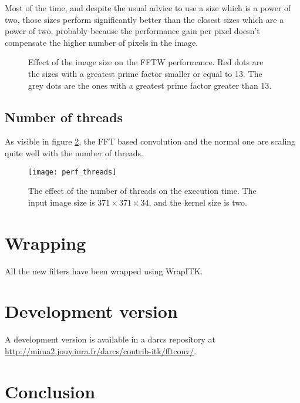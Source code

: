 \documentclass{InsightArticle}
\begin{document}
Most of the time, and despite the usual advice to use a size which is a power of two,
those sizes perform significantly better than the closest sizes which are a power of two, probably
because the performance gain per pixel doesn't compensate the higher number of pixels in the image.

\begin{figure}[htbp]
\begin{center}
\caption{Effect of the image size on the FFTW performance. Red dots are the sizes with a greatest prime
factor smaller or equal to 13. The grey dots are the ones with a greatest prime factor greater than 13.
\label{fig:perf-fftw3}}
\end{center}
\end{figure}

\subsection{Number of threads}

As visible in figure \ref{fig:perf-kernel}, the FFT based convolution and the normal one are scaling
quite well with the number of threads.

\begin{figure}[htbp]
\centering
\texttt{[image: perf\_threads]}
\caption{The effect of the number of threads on the execution time. The input image size is
$371 \times 371 \times 34$, and the kernel size is two.
\label{fig:perf-kernel}}
\end{figure}

\section{Wrapping}

All the new filters have been wrapped using WrapITK.

\section{Development version}

A development version is available in a darcs repository at
\url{http://mima2.jouy.inra.fr/darcs/contrib-itk/fftconv/}.

\section{Conclusion}
\end{document}
